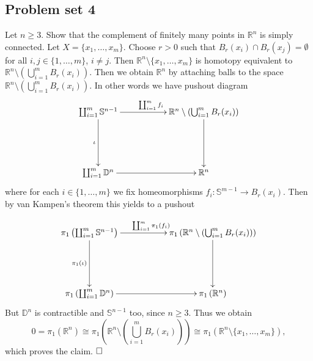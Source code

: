 \documentclass[11pt]{book}
\numberwithin{dummy}{section}
\theoremstyle{nonumberbreak}
\newenvironment{sol}[1][]{\ifthenelse{\equal{#1}{}}{\solution}{\solution[#1]}\rm}{\endsolution}
\newenvironment{prob}[1][]{\ifthenelse{\equal{#1}{}}{\problem}{\problem[#1]}\rm}{\endproblem}
\newcommand{\la}{\longrightarrow}
\begin{document}
\begin{spacing}{1.4}
\begin{prob}
\end{prob}





















\newpage

\titlespacing*{\section}{-16.5pt}{0pt}{20pt}
\renewcommand*\thesection{}
\section{Problem set 4} %
\renewcommand*\thesection{\arabic{section}}





\begin{prob}      %
Let $n \geqslant 3$. Show that the complement of finitely many points in $\mathbb{R}^n$ is simply connected.
\begin{sol}
Let $X=\{x_1, \ldots, x_m\}$. Choose $r>0$ such that $B_r(x_i) \cap B_r(x_j) = \emptyset$ for all $i,j \in \{1, \ldots, m\}$, $i\neq j$. Then $\mathbb{R}^n \setminus \{x_1, \ldots, x_m\}$ is homotopy equivalent to $\mathbb{R}^n \setminus \left( \bigcup_{i=1}^m B_r(x_i)\right)$. Then we obtain $\mathbb{R}^n$ by attaching balls to the space $\mathbb{R}^n \setminus \left( \bigcup_{i=1}^m B_r(x_i)\right)$. In other words we have pushout diagram
$$
\begin{xy}
\xymatrix{
\coprod_{i=1}^m \mathbb{S}^{n-1} \ar[dd]_{\iota} \ar[rr]^{\coprod_{i=1}^m f_i} && \mathbb{R}^n \setminus \left( \bigcup_{i=1}^m B_r(x_i)\right) \ar[dd] \\&& \\ \coprod_{i=1}^m \mathbb{D}^n \ar[rr] && \mathbb{R}^n
}
\end{xy}
$$
where for each $i \in \{1, \ldots, m\}$ we fix homeomorphisms $f_i: \mathbb{S}^{m-1} \la B_r(x_i)$. Then by van Kampen's theorem this yields to a pushout 

$$
\begin{xy}
\xymatrix{
\pi_1\left(\coprod_{i=1}^m \mathbb{S}^{n-1}\right) \ar[dd]_{\pi_1(\iota)} \ar[rr]^{\coprod_{i=1}^m \pi_1(f_i)} && \pi_1\left(\mathbb{R}^n \setminus \left( \bigcup_{i=1}^m B_r(x_i)\right)\right) \ar[dd] \\&& \\ \pi_1\left(\coprod_{i=1}^m \mathbb{D}^n\right) \ar[rr] && \pi_1\left(\mathbb{R}^n\right)
}
\end{xy}
$$
But $\mathbb{D}^n$ is contractible and $\mathbb{S}^{n-1}$ too, since $n \geqslant 3$. Thus we obtain 
$$0=\pi_1(\mathbb{R}^n) \cong \pi_1\left( \mathbb{R}^n \setminus \left( \bigcup_{i=1}^m B_r(x_i)\right) \right) \cong \pi_1(\mathbb{R}^n \setminus \{x_1, \ldots, x_m\}),$$
which proves the claim. $\hfill \Box$


\end{sol}
\end{prob}
\end{spacing}
\end{document}
